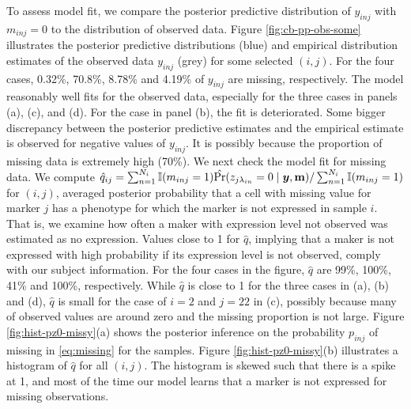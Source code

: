 \documentclass[12pt,]{article}
\def\Prob{\text{Pr}}
\newcommand{\by}{\mbox{\boldmath $y$}}
\newcommand{\ech}{\color{Black}\rm}
\newcommand{\hh}{\color{Mahogany}\it}
\begin{document}
To assess model fit, we compare the posterior predictive distribution of
$y_{inj}$ with $m_{inj}=0$ to the distribution of observed data. Figure
\ref{fig:cb-pp-obs-some} illustrates the
posterior predictive distributions (blue) and empirical distribution estimates of the observed data $y_{inj}$
(grey) for some selected $(i,j)$.  For the four cases, 0.32\%, 70.8\%, 8.78\% and 4.19\% of $y_{inj}$ are missing, respectively.   
The model reasonably well fits for the observed data, especially for the three cases in panels (a), (c), and (d).
For the case in panel (b), the fit is deteriorated. Some bigger discrepancy between the posterior predictive estimates and the empirical estimate is observed for negative values of $y_{inj}$.  It is  possibly because the proportion of missing data is extremely high (70\%).  
We next check the model fit for missing data.  We compute $\hat{q}_{ij}= \sum_{n=1}^{N_i}\mathbb{I}(m_{inj}=1)\hat{\Prob}(z_{j \lambda_{in}}=0 \mid \by, {\bf m})/\sum_{n=1}^{N_i}\mathbb{I}  (m_{inj}=1)$
for $(i,j)$, averaged posterior probability that a cell
with missing value for marker $j$ has a phenotype for which the marker is not
expressed in sample $i$.  That is, we examine how often a maker with expression
level not observed was estimated as no expression. Values close to 1 for
$\hat{q}$, implying that a maker is not expressed with high probability if its
expression level is not observed, comply with our subject information.  For the
four cases in the figure, $\hat{q}$ are 99\%, 100\%, 41\% and 100\%,
respectively. While $\hat{q}$ is close to 1 for the three cases in (a), (b) and
(d), $\hat{q}$ is small for the case of $i=2$ and $j=22$ in (c), possibly
because many of observed values are around zero and the missing proportion is
not large. Figure \ref{fig:hist-pz0-missy}(a) shows the posterior inference on
the probability $p_{inj}$ of missing in \eqref{eq:missing} for the samples.
%
%
Figure \ref{fig:hist-pz0-missy}(b) illustrates a histogram of $\hat{q}$ for all
$(i,j)$. The histogram is skewed such that there is a spike at 1, and most of
the time our model learns that a marker is not expressed for missing
observations.
\end{document}
